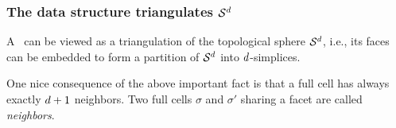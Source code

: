%

\subsubsection{The data structure triangulates $\mathcal S^{d}$}

A \tds\ can be viewed as
a {triangulation} of the topological sphere $\mathcal S^{d}$,
i.e., its faces can be embedded to form a partition of
$\mathcal S^{d}$ into $d$-simplices. 


One nice consequence of the above important fact is that a full cell has
always exactly  $d+1$ neighbors.
Two  full cells $\sigma$ and $\sigma'$ sharing a facet are called
{\em neighbors}.


